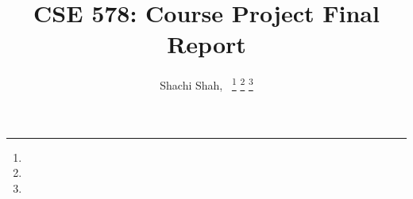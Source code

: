 \documentclass[journal,onecolumn]{IEEEtran}
\begin{document}
%
\title{CSE 578: Course Project Final Report}
%
%
%

\author{Shachi Shah,~
\thanks{}%
\thanks{}%
\thanks{}}

% 
%



% 
\end{document}
